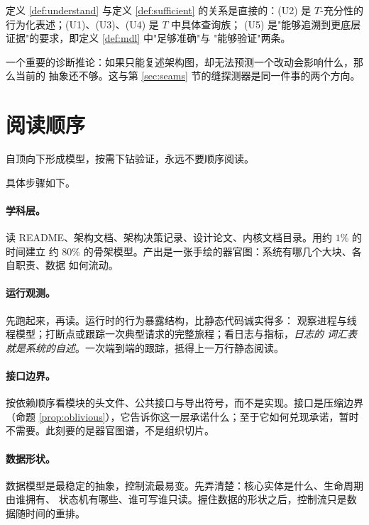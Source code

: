 定义 \ref{def:understand} 与定义 \ref{def:sufficient} 的关系是直接的：(U2) 是
$T$-充分性的行为化表述；(U1)、(U3)、(U4) 是 $T$ 中具体查询族；
(U5) 是"能够追溯到更底层证据"的要求，即定义 \ref{def:mdl} 中"足够准确"与
"能够验证"两条。

一个重要的诊断推论：如果只能复述架构图，却无法预测一个改动会影响什么，那么当前的
抽象还不够。这与第 \ref{sec:seams} 节的缝探测器是同一件事的两个方向。

\section{阅读顺序}\label{sec:protocol}

\begin{principle}[下行协议]\label{pr:protocol}
自顶向下形成模型，按需下钻验证，永远不要顺序阅读。
\end{principle}

具体步骤如下。

\paragraph{学科层。}
读 README、架构文档、架构决策记录、设计论文、内核文档目录。用约 $1\%$ 的时间建立
约 $80\%$ 的骨架模型。产出是一张手绘的器官图：系统有哪几个大块、各自职责、数据
如何流动。

\paragraph{运行观测。}
先跑起来，再读。运行时的行为暴露结构，比静态代码诚实得多：
观察进程与线程模型；打断点或跟踪一次典型请求的完整旅程；看日志与指标，\emph{日志的
词汇表就是系统的自述}。一次端到端的跟踪，抵得上一万行静态阅读。

\paragraph{接口边界。}
按依赖顺序看模块的头文件、公共接口与导出符号，而不是实现。接口是压缩边界
（命题 \ref{prop:oblivious}），它告诉你这一层承诺什么；至于它如何兑现承诺，暂时
不需要。此刻要的是器官图谱，不是组织切片。

\paragraph{数据形状。}
数据模型是最稳定的抽象，控制流最易变。先弄清楚：核心实体是什么、生命周期由谁拥有、
状态机有哪些、谁可写谁只读。握住数据的形状之后，控制流只是数据随时间的重排。

